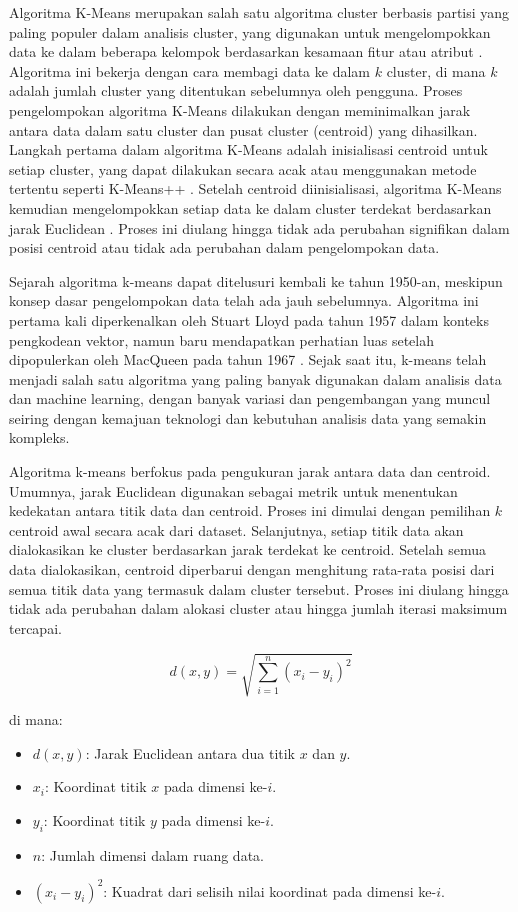\documentclass[
  oneside]{book}
\begin{document}
Algoritma K-Means merupakan salah satu algoritma cluster berbasis partisi yang paling populer dalam analisis cluster, yang digunakan untuk mengelompokkan data ke dalam beberapa kelompok berdasarkan kesamaan fitur atau atribut \citep{jain2010} . Algoritma ini bekerja dengan cara membagi data ke dalam \(k\) cluster, di mana \(k\) adalah jumlah cluster yang ditentukan sebelumnya oleh pengguna. Proses pengelompokan algoritma K-Means dilakukan dengan meminimalkan jarak antara data dalam satu cluster dan pusat cluster (centroid) yang dihasilkan. Langkah pertama dalam algoritma K-Means adalah inisialisasi centroid untuk setiap cluster, yang dapat dilakukan secara acak atau menggunakan metode tertentu seperti K-Means++ \citep{arthur2007kmeans}. Setelah centroid diinisialisasi, algoritma K-Means kemudian mengelompokkan setiap data ke dalam cluster terdekat berdasarkan jarak Euclidean \citep{hastie2009elements}. Proses ini diulang hingga tidak ada perubahan signifikan dalam posisi centroid atau tidak ada perubahan dalam pengelompokan data.

Sejarah algoritma k-means dapat ditelusuri kembali ke tahun 1950-an, meskipun konsep dasar pengelompokan data telah ada jauh sebelumnya. Algoritma ini pertama kali diperkenalkan oleh Stuart Lloyd pada tahun 1957 dalam konteks pengkodean vektor, namun baru mendapatkan perhatian luas setelah dipopulerkan oleh MacQueen pada tahun 1967 \citep{macqueen1967some}. Sejak saat itu, k-means telah menjadi salah satu algoritma yang paling banyak digunakan dalam analisis data dan machine learning, dengan banyak variasi dan pengembangan yang muncul seiring dengan kemajuan teknologi dan kebutuhan analisis data yang semakin kompleks.

Algoritma k-means berfokus pada pengukuran jarak antara data dan centroid. Umumnya, jarak Euclidean digunakan sebagai metrik untuk menentukan kedekatan antara titik data dan centroid. Proses ini dimulai dengan pemilihan \(k\) centroid awal secara acak dari dataset. Selanjutnya, setiap titik data akan dialokasikan ke cluster berdasarkan jarak terdekat ke centroid. Setelah semua data dialokasikan, centroid diperbarui dengan menghitung rata-rata posisi dari semua titik data yang termasuk dalam cluster tersebut. Proses ini diulang hingga tidak ada perubahan dalam alokasi cluster atau hingga jumlah iterasi maksimum tercapai.

\[
d(x, y) = \sqrt{\sum_{i=1}^{n} (x_i - y_i)^2}
\]

di mana:

\begin{itemize}
\item
  \(d(x, y)\): Jarak Euclidean antara dua titik \(x\) dan \(y\).
\item
  \(x_i\): Koordinat titik \(x\) pada dimensi ke-\(i\).
\item
  \(y_i\): Koordinat titik \(y\) pada dimensi ke-\(i\).
\item
  \(n\): Jumlah dimensi dalam ruang data.
\item
  \((x_i - y_i)^2\): Kuadrat dari selisih nilai koordinat pada dimensi ke-\(i\).
\end{itemize}
\end{document}
